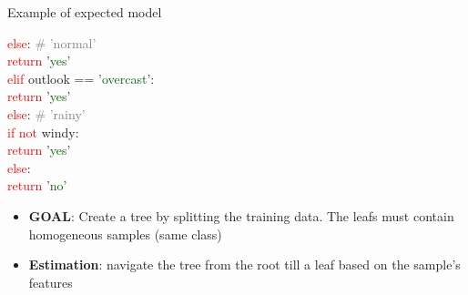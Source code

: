 \documentclass[xcolor=table]{beamer}
\begin{document}
\begin{frame}
\begin{exampleblock}{Example of expected model}
\begin{minipage}{0.25\textwidth}
		\hspace*{10pt}\textcolor{red}{else}: \textcolor{gray}{\# 'normal'}\\
		\hspace*{20pt}\textcolor{red}{return} '\textcolor{darkgreen}{yes}'\\
		\textcolor{red}{elif}  outlook == '\textcolor{darkgreen}{overcast}':\\
		\hspace*{10pt}\textcolor{red}{return} '\textcolor{darkgreen}{yes}'\\
		\textcolor{red}{else}: \textcolor{gray}{\# 'rainy'}\\
		\hspace*{10pt}\textcolor{red}{if not} windy:\\
		\hspace*{20pt}\textcolor{red}{return} '\textcolor{darkgreen}{yes}'\\
		\hspace*{10pt}\textcolor{red}{else}:\\
		\hspace*{20pt}\textcolor{red}{return} '\textcolor{darkgreen}{no}' 
	\end{minipage}
	\begin{minipage}{0.38\textwidth} 
	\end{minipage}
	\end{exampleblock}
	
	\vspace{-6pt}
	\begin{itemize}
		\item \textbf{GOAL}: Create a tree by splitting the training data. The leafs must contain homogeneous samples (same class)
		\item \textbf{Estimation}: navigate the tree from the root till a leaf based on the sample's features
	\end{itemize}
	
\end{frame}
\end{document}
